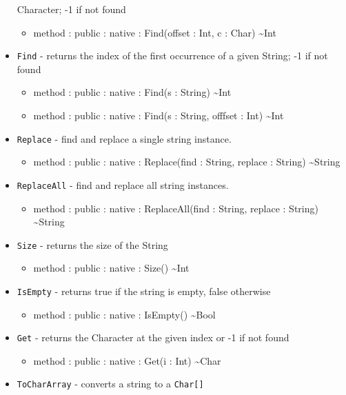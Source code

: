 \documentclass[11pt]{article}
\begin{document}
\begin{itemize}
  Character; -1 if not found
  \begin{itemize}
  \item method : public : native : Find(offset : Int, c : Char) \textasciitilde Int
  \end{itemize}
\item \texttt{Find} - returns the index of the first occurrence of a
  given String; -1 if not found
  \begin{itemize}
  \item method : public : native : Find(s : String) \textasciitilde Int
  \item method : public : native : Find(s : String, offfset : Int) \textasciitilde Int
  \end{itemize}
\item \texttt{Replace} - find and replace a single string instance.
  \begin{itemize}
  \item method : public : native : Replace(find : String, replace : String) \textasciitilde String
  \end{itemize}  
\item \texttt{ReplaceAll} - find and replace all string instances.
  \begin{itemize}  
  \item method : public : native : ReplaceAll(find : String, replace : String) \textasciitilde String
  \end{itemize}
\item \texttt{Size} - returns the size of the String
  \begin{itemize}
  \item method : public : native : Size() \textasciitilde Int
  \end{itemize}
\item \texttt{IsEmpty} - returns true if the string is empty, false
  otherwise
  \begin{itemize}
  \item method : public : native : IsEmpty() \textasciitilde Bool
  \end{itemize}
\item \texttt{Get} - returns the Character at the given index or -1 if
  not found
  \begin{itemize}
  \item method : public : native : Get(i : Int) \textasciitilde Char
  \end{itemize}
\item \texttt{ToCharArray} - converts a string to a \texttt{Char[]}
  \begin{itemize}

\end{itemize}
\end{itemize}
\end{document}
